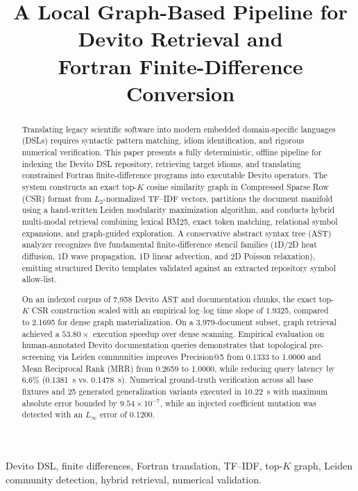 \documentclass[conference]{IEEEtran}
\title{A Local Graph-Based Pipeline for Devito Retrieval and\\Fortran Finite-Difference Conversion}
\author{\IEEEauthorblockN{Kartikey Juyal \and Shakti Singh}}
\begin{document}
\maketitle

\begin{abstract}
Translating legacy scientific software into modern embedded domain-specific languages (DSLs) requires syntactic pattern matching, idiom identification, and rigorous numerical verification. This paper presents a fully deterministic, offline pipeline for indexing the Devito DSL repository, retrieving target idioms, and translating constrained Fortran finite-difference programs into executable Devito operators. The system constructs an exact top-$K$ cosine similarity graph in Compressed Sparse Row (CSR) format from $L_2$-normalized TF--IDF vectors, partitions the document manifold using a hand-written Leiden modularity maximization algorithm, and conducts hybrid multi-modal retrieval combining lexical BM25, exact token matching, relational symbol expansions, and graph-guided exploration. A conservative abstract syntax tree (AST) analyzer recognizes five fundamental finite-difference stencil families (1D/2D heat diffusion, 1D wave propagation, 1D linear advection, and 2D Poisson relaxation), emitting structured Devito templates validated against an extracted repository symbol allow-list. 

On an indexed corpus of 7,958 Devito AST and documentation chunks, the exact top-$K$ CSR construction scaled with an empirical log--log time slope of 1.9325, compared to 2.1695 for dense graph materialization. On a 3,979-document subset, graph retrieval achieved a $53.80\times$ execution speedup over dense scanning. Empirical evaluation on human-annotated Devito documentation queries demonstrates that topological pre-screening via Leiden communities improves Precision@5 from 0.1333 to 1.0000 and Mean Reciprocal Rank (MRR) from 0.2659 to 1.0000, while reducing query latency by 6.6\% (0.1381~s vs. 0.1478~s). Numerical ground-truth verification across all base fixtures and 25 generated generalization variants executed in 10.22~s with maximum absolute error bounded by $9.54\times 10^{-7}$, while an injected coefficient mutation was detected with an $L_\infty$ error of 0.1200.
\end{abstract}

\begin{IEEEkeywords}
Devito DSL, finite differences, Fortran translation, TF--IDF, top-$K$ graph, Leiden community detection, hybrid retrieval, numerical validation.
\end{IEEEkeywords}
\end{document}
